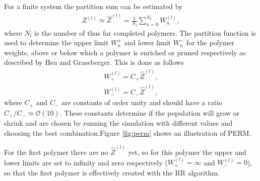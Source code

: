 For a finite system the partition sum can be estimated\cite{hsu2011review} by 
\begin{gather*}
    Z^{(l)} \simeq \hat{Z}^{(l)}
    = \frac{1}{N_l} \sum_{n=0}^{N_l}W_n^{(l)},
\end{gather*} where $N_l$ is the number of thus far completed polymers. The partition function is used to determine the upper limit $W_n^+$ and lower limit $W_n^-$ for the polymer weights, above or below which a polymer is enriched or pruned respectively as described by Hsu and Grassberger\cite{hsu2011review}. This is done as follows
\begin{gather*}
    W_+^{(l)} = C_+\hat{Z}^{(l)},\\
    W_-^{(l)} = C_-\hat{Z}^{(l)},
\end{gather*} where $C_+$ and $C_-$ are constants of order unity and should have a ratio $C_+/C_- \simeq \mathcal{O}(10)$. These constants determine if the population will grow or shrink and are chosen by running the simulation with different values and choosing the best combination.Figure \ref{fig:perm} shows an illustration of PERM.

For the first polymer there are no $\hat{Z}^{(l)}$ yet, so for this polymer the upper and lower limits are set to infinity and zero respectively ($ W_+^{(l)}= \infty$ and $W_-^{(l)}=0$), so that the first polymer is effectively created with the RR algorithm.

